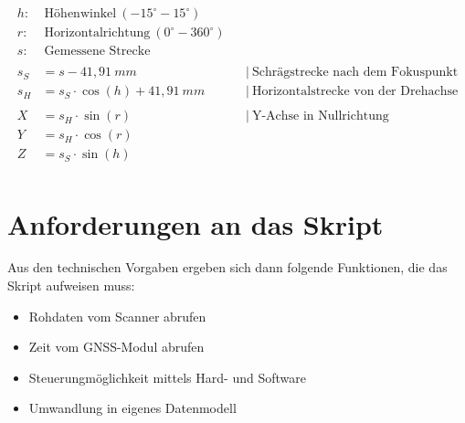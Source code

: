 \documentclass[a4paper,12pt,bibliography=totoc, listof=totoc,titlepage,pointlessnumbers]{scrreprt}
\begin{document}
\begin{equation}
\begin{aligned}
h:&~\text{H\"{o}henwinkel}~(-15^\circ - 15^\circ) \\
r:&~\text{Horizontalrichtung}~(0^\circ - 360^\circ) \\
s:&~\text{Gemessene~Strecke} \\
\\
s_S &= s - 41,91~mm    		 && \left|\  \text{Schr\"{a}gstrecke nach dem Fokuspunkt} \right. \\
s_H &= s_S \cdot \cos(h) + 41,91~mm  && \left|\  \text{Horizontalstrecke von der Drehachse} \right. \\
\\
X &= s_H \cdot \sin(r) && \left|\  \text{Y-Achse in Nullrichtung} \right. \\
Y &= s_H \cdot \cos(r) \\
Z &= s_S \cdot \sin(h) \\
\end{aligned}
\label{equ:koordinaten}
\end{equation}

\section{Anforderungen an das Skript}
\label{s:anforderungen}
Aus den technischen Vorgaben ergeben sich dann folgende Funktionen, die das Skript aufweisen muss:
\begin{itemize}
 \item Rohdaten vom Scanner abrufen
 \item Zeit vom GNSS-Modul abrufen
 \item Steuerungmöglichkeit mittels Hard- und Software
 \item Umwandlung in eigenes Datenmodell
\end{itemize}
\end{document}
